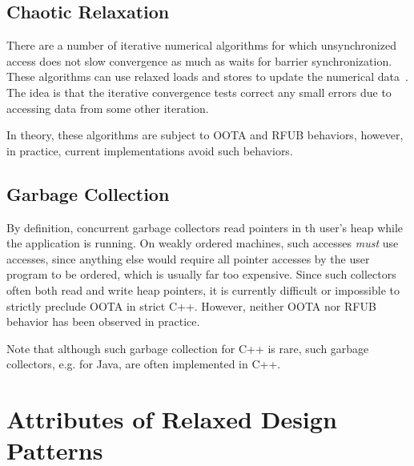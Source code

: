 \documentclass[10]{article}
\begin{document}
\subsection{Chaotic Relaxation}
\label{sec:Chaotic Relaxation}

There are a number of iterative numerical algorithms for which unsynchronized
access does not slow convergence as much as waits for barrier synchronization.
These algorithms can use relaxed loads and stores to update the numerical
data~\cite{Andrews91textbook}.
The idea is that the iterative convergence tests correct any small errors
due to accessing data from some other iteration.

In theory, these algorithms are subject to OOTA and RFUB behaviors, however,
in practice, current implementations avoid such behaviors.

\subsection{Garbage Collection}
\label{sec:Garbage Collection}

By definition, concurrent garbage collectors read pointers in th
user's heap while the application is running.
On weakly ordered machines, such accesses {\it must} use
 accesses, since anything else would require
all pointer accesses by the user program to be ordered, which is usually
far too expensive.
Since such collectors often both read and write heap pointers, it is
currently difficult or impossible to strictly preclude OOTA in strict C++.
However, neither OOTA nor RFUB behavior has been observed in practice.

Note that although such garbage collection for C++ is rare, such garbage
collectors, e.g. for Java, are often implemented in C++.


\section{Attributes of Relaxed Design Patterns}
\label{sec:Attributes of Relaxed Design Patterns}
\end{document}
